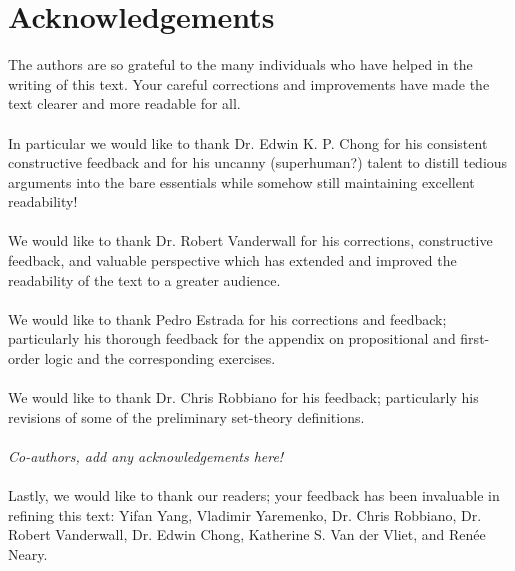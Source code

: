 \section{Acknowledgements}
The authors are so grateful to the many individuals who have helped in the writing of this text. Your careful corrections and improvements have made the text clearer and more readable for all.
 \\ \\
In particular we would like to thank Dr. Edwin K. P. Chong for his consistent constructive feedback and for his uncanny (superhuman?) talent to distill tedious arguments into the bare essentials while somehow still maintaining excellent readability! \\ \\
We would like to thank Dr. Robert Vanderwall for his corrections, constructive feedback, and valuable perspective which has extended and improved the readability of the text to a greater audience. 
\\ \\
We would like to thank Pedro Estrada for his corrections and feedback; particularly his thorough feedback for the appendix on propositional and first-order logic and the corresponding exercises. \\ \\
We would like to thank Dr. Chris Robbiano for his feedback; particularly his revisions of some of the preliminary set-theory definitions. \\ \\
\textit{Co-authors, add any acknowledgements here!} \\ \\

\noindent Lastly, we would like to thank our readers; your feedback has been invaluable in refining this text: Yifan Yang, Vladimir Yaremenko, Dr. Chris Robbiano, Dr. Robert Vanderwall, Dr. Edwin Chong, Katherine S. Van der Vliet, and Ren\'{e}e Neary.
